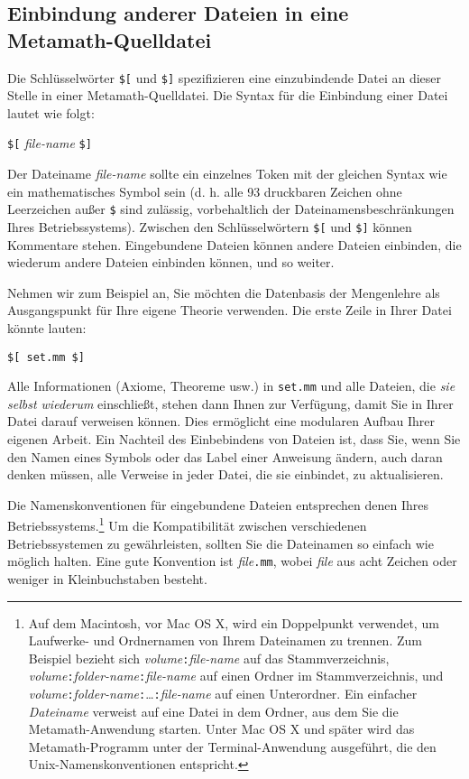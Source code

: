 \subsection{Einbindung anderer Dateien in eine Metamath-Quelldatei} \label{include}

Die Schlüsselwörter \texttt{\$[} und \texttt{\$]} spezifizieren eine einzubindende Datei an dieser Stelle in einer Metamath-Quelldatei.  Die Syntax für die Einbindung einer Datei lautet wie folgt:
\begin{center}
\texttt{\$[} {\em file-name} \texttt{\$]}
\end{center}

Der Dateiname {\em file-name} sollte ein einzelnes Token mit der gleichen Syntax wie ein mathematisches Symbol sein (d. h. alle 93 druckbaren Zeichen ohne Leerzeichen außer \texttt{\$} sind zulässig, vorbehaltlich der Dateinamensbeschränkungen Ihres Betriebssystems). Zwischen den Schlüsselwörtern \texttt{\$[} und \texttt{\$]} können Kommentare stehen.  Eingebundene Dateien können andere Dateien einbinden, die wiederum andere Dateien einbinden können, und so weiter.

Nehmen wir zum Beispiel an, Sie möchten die Datenbasis der Mengenlehre als Ausgangspunkt für Ihre eigene Theorie verwenden.  Die erste Zeile in Ihrer Datei könnte lauten: 
\begin{center} 
  \texttt{\$[ set.mm \$]} 
\end{center} 
Alle Informationen (Axiome, Theoreme usw.) in \texttt{set.mm} und alle Dateien, die {\em sie selbst wiederum} einschließt, stehen dann Ihnen zur Verfügung, damit Sie in Ihrer Datei darauf verweisen können. Dies ermöglicht eine modularen Aufbau Ihrer eigenen Arbeit. Ein Nachteil des Einbebindens von Dateien ist, dass Sie, wenn Sie den Namen eines Symbols oder das Label einer Anweisung ändern, auch daran denken müssen, alle Verweise in jeder Datei, die sie einbindet, zu aktualisieren.

Die Namenskonventionen für eingebundene Dateien entsprechen denen Ihres Betriebssystems.\footnote{Auf dem Macintosh, vor Mac OS X, wird ein Doppelpunkt verwendet, um Laufwerke- und Ordnernamen von Ihrem Dateinamen zu trennen.  Zum Beispiel bezieht sich {\em volume}\texttt{:}{\em file-name} auf das Stammverzeichnis, {\em volume}\texttt{:}{\em folder-name}\texttt{:}{\em file-name} auf einen Ordner im Stammverzeichnis, und {\em volume}\texttt{:}{\em folder-name}\texttt{:}\ldots\texttt{:}{\em file-name} auf einen Unterordner.  Ein einfacher {\em Dateiname} verweist auf eine Datei in dem Ordner, aus dem Sie die Metamath-Anwendung starten.  Unter Mac OS X und später wird das Metamath-Programm unter der Terminal-Anwendung ausgeführt, die den Unix-Namenskonventionen entspricht.}\label{includef} Um die Kompatibilität zwischen verschiedenen Betriebssystemen zu gewährleisten, sollten Sie die Dateinamen so einfach wie möglich halten.  Eine gute Konvention ist {\em file}\texttt{.mm}, wobei {\em file} aus acht Zeichen oder weniger in Kleinbuchstaben besteht. 

